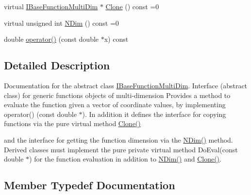 \begin{DoxyCompactItemize}
\item 
virtual \mbox{\hyperlink{classROOT_1_1Math_1_1IBaseFunctionMultiDim}{I\+Base\+Function\+Multi\+Dim}} $\ast$ \mbox{\hyperlink{classROOT_1_1Math_1_1IBaseFunctionMultiDim_a57939204b1f525b43835b42e0635dd3b}{Clone}} () const =0
\item 
virtual unsigned int \mbox{\hyperlink{classROOT_1_1Math_1_1IBaseFunctionMultiDim_a16f37dc7a6d00c75ddeda0697741315d}{N\+Dim}} () const =0
\item 
double \mbox{\hyperlink{classROOT_1_1Math_1_1IBaseFunctionMultiDim_a7efd1892dc6473b3f8aaaff3cbb8bb2f}{operator()}} (const double $\ast$x) const
\end{DoxyCompactItemize}


\subsection{Detailed Description}
Documentation for the abstract class \mbox{\hyperlink{classROOT_1_1Math_1_1IBaseFunctionMultiDim}{I\+Base\+Function\+Multi\+Dim}}. Interface (abstract class) for generic functions objects of multi-\/dimension Provides a method to evaluate the function given a vector of coordinate values, by implementing operator() (const double $\ast$). In addition it defines the interface for copying functions via the pure virtual method \mbox{\hyperlink{classROOT_1_1Math_1_1IBaseFunctionMultiDim_a57939204b1f525b43835b42e0635dd3b}{Clone()}}

and the interface for getting the function dimension via the \mbox{\hyperlink{classROOT_1_1Math_1_1IBaseFunctionMultiDim_a16f37dc7a6d00c75ddeda0697741315d}{N\+Dim()}} method. Derived classes must implement the pure private virtual method Do\+Eval(const double $\ast$) for the function evaluation in addition to \mbox{\hyperlink{classROOT_1_1Math_1_1IBaseFunctionMultiDim_a16f37dc7a6d00c75ddeda0697741315d}{N\+Dim()}} and \mbox{\hyperlink{classROOT_1_1Math_1_1IBaseFunctionMultiDim_a57939204b1f525b43835b42e0635dd3b}{Clone()}}. 

\subsection{Member Typedef Documentation}
\mbox{\label{classROOT_1_1Math_1_1IBaseFunctionMultiDim_a44c87c3e8c23d140cc3bf067d6480070}} 
